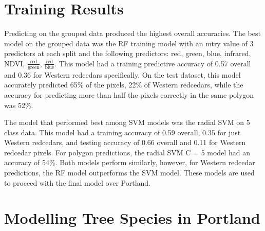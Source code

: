 \documentclass[12pt,twoside]{reedthesis}
\begin{document}
\hypertarget{training-results}{%
\section{Training Results}\label{training-results}}

Predicting on the grouped data produced the highest overall accuracies. The best model on the grouped data was the RF training model with an mtry value of 3 predictors at each split and the following predictors: red, green, blue, infrared, NDVI, \(\frac{\mbox{red}}{\mbox{green}}\), \(\frac{\mbox{red}}{\mbox{blue}}\). This model had a training predictive accuracy of 0.57 overall and 0.36 for Western redcedars specifically. On the test dataset, this model accurately predicted 65\% of the pixels, 22\% of Western redcedars, while the accuracy for predicting more than half the pixels correctly in the same polygon was 52\%.

The model that performed best among SVM models was the radial SVM on 5 class data. This model had a training accuracy of 0.59 overall, 0.35 for just Western redcedars, and testing accuracy of 0.66 overall and 0.11 for Western redcedar pixels. For polygon predictions, the radial SVM C = 5 model had an accuracy of 54\%. Both models perform similarly, however, for Western redcedar predictions, the RF model outperforms the SVM model. These models are used to proceed with the final model over Portland.

\hypertarget{modelling-tree-species-in-portland}{%
\section{Modelling Tree Species in Portland}\label{modelling-tree-species-in-portland}}
\end{document}
